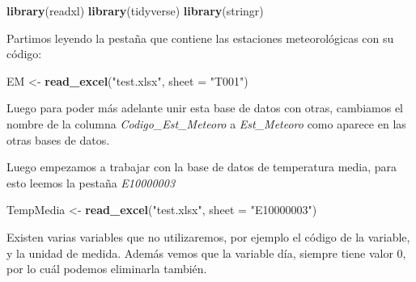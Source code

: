 \documentclass[]{book}
\newenvironment{Shaded}{\begin{snugshade}}{\end{snugshade}}
\newcommand{\DataTypeTok}[1]{\textcolor[rgb]{0.13,0.29,0.53}{#1}}
\newcommand{\KeywordTok}[1]{\textcolor[rgb]{0.13,0.29,0.53}{\textbf{#1}}}
\newcommand{\NormalTok}[1]{#1}
\newcommand{\OperatorTok}[1]{\textcolor[rgb]{0.81,0.36,0.00}{\textbf{#1}}}
\newcommand{\StringTok}[1]{\textcolor[rgb]{0.31,0.60,0.02}{#1}}
\begin{document}
\begin{Shaded}
\begin{Highlighting}[]
\KeywordTok{library}\NormalTok{(readxl)}
\KeywordTok{library}\NormalTok{(tidyverse)}
\KeywordTok{library}\NormalTok{(stringr)}
\end{Highlighting}
\end{Shaded}

Partimos leyendo la pestaña que contiene las estaciones meteorológicas
con su código:

\begin{Shaded}
\begin{Highlighting}[]
\NormalTok{EM <-}\StringTok{ }\KeywordTok{read_excel}\NormalTok{(}\StringTok{"test.xlsx"}\NormalTok{, }\DataTypeTok{sheet =} \StringTok{"T001"}\NormalTok{)}
\end{Highlighting}
\end{Shaded}

Luego para poder más adelante unir esta base de datos con otras,
cambiamos el nombre de la columna \emph{Codigo\_Est\_Meteoro} a
\emph{Est\_Meteoro} como aparece en las otras bases de datos.

\begin{Shaded}
\end{Shaded}

Luego empezamos a trabajar con la base de datos de temperatura media,
para esto leemos la pestaña \emph{E10000003}

\begin{Shaded}
\begin{Highlighting}[]
\NormalTok{TempMedia <-}\StringTok{ }\KeywordTok{read_excel}\NormalTok{(}\StringTok{"test.xlsx"}\NormalTok{, }\DataTypeTok{sheet =} \StringTok{"E10000003"}\NormalTok{)}
\end{Highlighting}
\end{Shaded}

Existen varias variables que no utilizaremos, por ejemplo el código de
la variable, y la unidad de medida. Además vemos que la variable día,
siempre tiene valor 0, por lo cuál podemos eliminarla también.

\begin{Shaded}
\end{Shaded}
\end{document}
